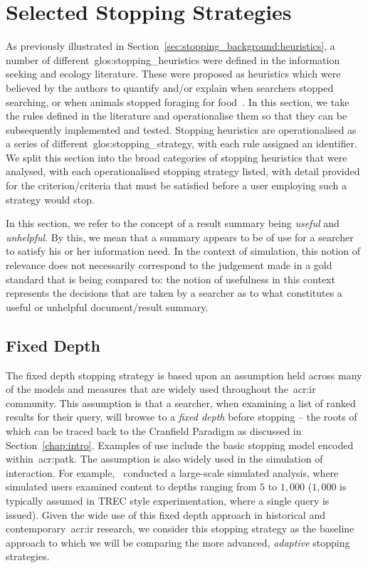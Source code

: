 \section{Selected Stopping Strategies}\label{sec:proposal:strategies}
As previously illustrated in Section~\ref{sec:stopping_background:heuristics}, a number of different~\glspl{glos:stopping_heuristic} were defined in the information seeking and ecology literature. These were proposed as heuristics which were believed by the authors to quantify and/or explain when searchers stopped searching, or when animals stopped foraging for food~\cite{maxwell2015stopping_strategies}. In this section, we take the rules defined in the literature and operationalise them so that they can be subsequently implemented and tested. Stopping heuristics are operationalised as a series of different~\gls{glos:stopping_strategy}, with each rule assigned an identifier. We split this section into the  broad categories of stopping heuristics that were analysed, with each operationalised stopping strategy listed, with detail provided for the criterion/criteria that must be satisfied before a user employing such a strategy would stop. 

\noindent{} In this section, we refer to the concept of a result summary being \emph{useful} and \emph{unhelpful}. By this, we mean that a summary appears to be of use for a searcher to satisfy his or her information need. In the context of simulation, this notion of relevance does not necessarily correspond to the judgement made in a gold standard that is being compared to: the notion of usefulness in this context represents the decisions that are taken by a searcher as to what constitutes a useful or unhelpful document/result summary.

\subsection{Fixed Depth}
The fixed depth stopping strategy is based upon an assumption held across many of the models and measures that are widely used throughout the~\gls{acr:ir} community. This assumption is that a searcher, when examining a list of ranked results for their query, will browse to a \emph{fixed depth} before stopping -- the roots of which can be traced back to the Cranfield Paradigm as discussed in Section~\ref{chap:intro}. Examples of use include the basic stopping model encoded within~\gls{acr:patk}. The assumption is also widely used in the simulation of interaction. For example,~\cite{azzopardi2011economics} conducted a large-scale simulated analysis, where simulated users examined content to depths ranging from $5$ to $1,000$ ($1,000$ is typically assumed in TREC style experimentation, where a single query is issued). Given the wide use of this fixed depth approach in historical and contemporary~\gls{acr:ir} research, we consider this stopping strategy as the baseline approach to which we will be comparing the more advanced, \emph{adaptive} stopping strategies.

